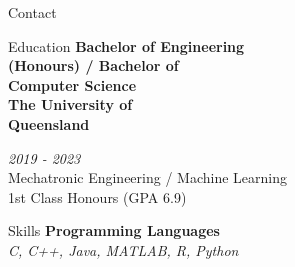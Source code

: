 \documentclass{custom-resume}
\begin{document}
\selectfont  %


\TitleRule

\begin{minipage}[t]{0.25\textwidth}


  \raggedright


  \begin{section}{Contact}
  \end{section}


  \begin{section}{Education}
    {
      \small
      \textbf{Bachelor of Engineering\\ (Honours) / Bachelor of\\ Computer Science}
    } \\[8pt]

    {
      \large
      \textbf{The University of\\ Queensland} \\[8pt]
    }

    \textit{2019 - 2023} \\[8pt]

    Mechatronic Engineering / Machine Learning \\[8pt]

    1st Class Honours (GPA 6.9)

  \end{section}


  \begin{section*}{Skills}
    \textbf{Programming Languages} \\[2pt]
    \textit{C, C++, Java, MATLAB, R, Python} \\[8pt]


\end{section*}
\end{minipage}
\end{document}
